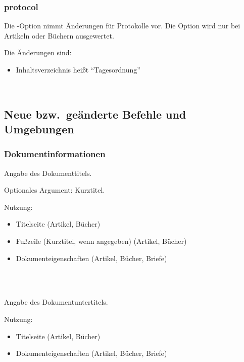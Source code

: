 \subsubsection{protocol}

Die -Option nimmt Änderungen für Protokolle vor.
Die Option wird nur bei Artikeln oder Büchern ausgewertet.

Die Änderungen sind:
\begin{itemize}
	\item Inhaltsverzeichnis heißt "`Tagesordnung"'
\end{itemize}

\begin{nutzung}
		\>\\
\end{nutzung}



\subsection{Neue bzw.\ geänderte Befehle und Umgebungen}

\subsubsection{Dokumentinformationen}

\DescribeMacro{\title}
Angabe des Dokumenttitels.

Optionales Argument: Kurztitel.

Nutzung:
\begin{itemize}
	\item Titelseite (Artikel, Bücher)
	\item Fußzeile (Kurztitel, wenn angegeben) (Artikel, Bücher)
	\item Dokumenteigenschaften (Artikel, Bücher, Briefe)
\end{itemize}

\begin{nutzung}
		\>\\
	\beispiel
		\>\\
		\>
\end{nutzung}

\DescribeMacro{\subtitle}
Angabe des Dokumentuntertitels.

Nutzung:
\begin{itemize}
	\item Titelseite (Artikel, Bücher)
	\item Dokumenteigenschaften (Artikel, Bücher, Briefe)
\end{itemize}

